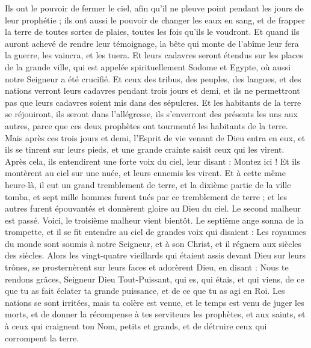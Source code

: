 \begin{multicols}{2}
Ils ont le pouvoir de fermer le ciel, afin qu'il ne pleuve point pendant les jours de leur prophétie ; ils ont aussi le pouvoir de changer les eaux en sang, et de frapper la terre de toutes sortes de plaies, toutes les fois qu'ils le voudront.
Et quand ils auront achevé de rendre leur témoignage, la bête qui monte de l'abîme leur fera la guerre, les vaincra, et les tuera.
Et leurs cadavres seront étendus sur les places de la grande ville, qui est appelée spirituellement Sodome et Egypte, où aussi notre Seigneur a été crucifié.
Et ceux des tribus, des peuples, des langues, et des nations verront leurs cadavres pendant trois jours et demi, et ils ne permettront pas que leurs cadavres soient mis dans des sépulcres.
Et les habitants de la terre se réjouiront, ils seront dans l'allégresse, ils s'enverront des présents les uns aux autres, parce que ces deux prophètes ont tourmenté les habitants de la terre.
Mais après ces trois jours et demi, l'Esprit de vie venant de Dieu entra en eux, et ils se tinrent sur leurs pieds, et une grande crainte saisit ceux qui les virent.
Après cela, ils entendirent une forte voix du ciel, leur disant : Montez ici ! Et ils montèrent au ciel sur une nuée, et leurs ennemis les virent.
Et à cette même heure-là, il eut un grand tremblement de terre, et la dixième partie de la ville tomba, et sept mille hommes furent tués par ce tremblement de terre ; et les autres furent épouvantés et donnèrent gloire au Dieu du ciel.
Le second malheur est passé. Voici, le troisième malheur vient bientôt.
Le septième ange sonna de la trompette, et il se fit entendre au ciel de grandes voix qui disaient : Les royaumes du monde sont soumis à notre Seigneur, et à son Christ, et il régnera aux siècles des siècles.
Alors les vingt-quatre vieillards qui étaient assis devant Dieu sur leurs trônes, se prosternèrent sur leurs faces et adorèrent Dieu,
en disant : Nous te rendons grâces, Seigneur Dieu Tout-Puissant, qui es, qui étais, et qui viens, de ce que tu as fait éclater ta grande puissance, et de ce que tu as agi en Roi.
Les nations se sont irritées, mais ta colère est venue, et le temps est venu de juger les morts, et de donner la récompense à tes serviteurs les prophètes, et aux saints, et à ceux qui craignent ton Nom, petits et grands, et de détruire ceux qui corrompent la terre.

\end{multicols}
